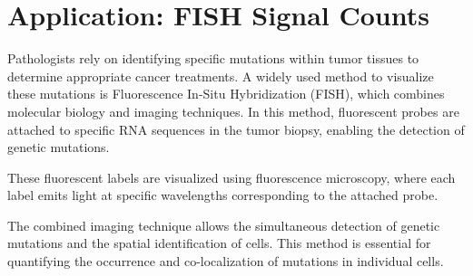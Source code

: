 \documentclass[a4paper,12pt]{article}
\begin{document}

\section{Application: FISH Signal Counts}


Pathologists rely on identifying specific mutations within tumor tissues to determine appropriate cancer treatments. A widely used method to visualize these mutations is Fluorescence In-Situ Hybridization (FISH), which combines molecular biology and imaging techniques. In this method, fluorescent probes are attached to specific RNA sequences in the tumor biopsy, enabling the detection of genetic mutations.

These fluorescent labels are visualized using fluorescence microscopy, where each label emits light at specific wavelengths corresponding to the attached probe.

The combined imaging technique allows the simultaneous detection of genetic mutations and the spatial identification of cells. This method is essential for quantifying the occurrence and co-localization of mutations in individual cells.
\end{document}
